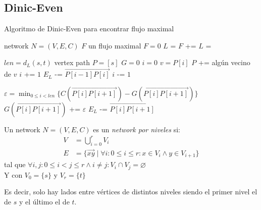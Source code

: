\subsection{Dinic-Even}

\begin{algorithm}
\caption{Algoritmo de Dinic-Even para encontrar flujo maximal}
\begin{algorithmic}
\Require network $N=(V,E,C)$
\Ensure  $F$ un flujo maximal
\State $F = 0$
\State $L$ =  
    \State $F$ += 
    \State $L$ = 
\EndWhile
\State {}
\EndFunction

\State

\State $len = d_L(s,t)$
\State vertex path $P = [s]$
\State $G = 0$ 
    \State $i = 0$
            \State $v = P[i]$
                \State $P$ += algún vecino de $v$
                \State $i$ += $1$
                \State $E_L$ -= $\overrightarrow{P[i-1] P[i]}$
                \State $i$ -= $1$
            \Else
                \State {} 
            \EndIf
        \EndWhile
    
        \State $\varepsilon = \min_{0\le i < len} \{ C(\overrightarrow{P[i] P[i+1]}) - G(\overrightarrow{P[i] P[i+1]})\}$
            \State $G(\overrightarrow{P[i] P[i+1]})$ += $\varepsilon$
                \State $E_L$ -= $\overrightarrow{P[i] P[i+1]}$
            \EndIf
        \EndFor
    \EndWhile
\EndFunction
\end{algorithmic}
\end{algorithm}

\begin{definition}
Un network $N = (V,E,C)$ es un \emph{network por niveles} si:
\begin{align}
 V &= \bigcup_{i=0}^r V_i \\
 E &= \{\overrightarrow{xy} \mid \forall i: 0 \le i \le r : x \in V_i \wedge y \in V_{i+1}\}
 \end{align}
 tal que $\forall i, j : 0 \le i < j \le r \wedge i \neq j : V_i \cap V_j = \varnothing$ \\
Y con $V_0 = \{s\} \text{ y } V_r = \{t\}$

Es decir, solo hay lados entre vértices de distintos niveles siendo el primer nivel el de $s$ y el último el de $t$.
\end{definition}

